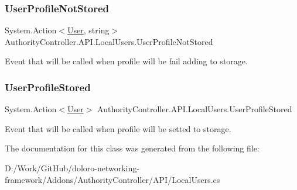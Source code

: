 \subsubsection{\texorpdfstring{User\+Profile\+Not\+Stored}{UserProfileNotStored}}
{\footnotesize\ttfamily System.\+Action$<$\mbox{\hyperlink{class_authority_controller_1_1_data_1_1_personal_1_1_user}{User}}, string$>$ Authority\+Controller.\+A\+P\+I.\+Local\+Users.\+User\+Profile\+Not\+Stored\hspace{0.3cm}{\ttfamily [static]}}



Event that will be called when profile will be fail adding to storage. 

\mbox{\label{class_authority_controller_1_1_a_p_i_1_1_local_users_af973c97a05818a9e360aadca02da8834}} 
\subsubsection{\texorpdfstring{User\+Profile\+Stored}{UserProfileStored}}
{\footnotesize\ttfamily System.\+Action$<$\mbox{\hyperlink{class_authority_controller_1_1_data_1_1_personal_1_1_user}{User}}$>$ Authority\+Controller.\+A\+P\+I.\+Local\+Users.\+User\+Profile\+Stored\hspace{0.3cm}{\ttfamily [static]}}



Event that will be called when profile will be setted to storage. 



The documentation for this class was generated from the following file\+:\begin{DoxyCompactItemize}
\item 
D\+:/\+Work/\+Git\+Hub/doloro-\/networking-\/framework/\+Addons/\+Authority\+Controller/\+A\+P\+I/Local\+Users.\+cs\end{DoxyCompactItemize}
